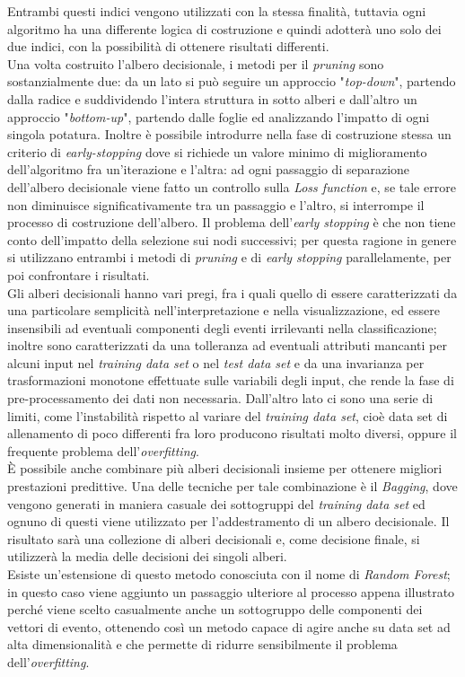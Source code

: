 Entrambi questi indici vengono utilizzati con la stessa finalità, tuttavia ogni algoritmo ha una differente logica di costruzione e quindi adotterà uno solo dei due indici, con la possibilità di ottenere risultati differenti. \\
Una volta costruito l'albero decisionale, i metodi per il \textit{pruning} sono sostanzialmente due: da un lato si può seguire un approccio "\textit{top-down}", partendo dalla radice e suddividendo l'intera struttura in sotto alberi e dall'altro un approccio "\textit{bottom-up}", partendo dalle foglie ed analizzando l'impatto di ogni singola potatura. Inoltre è possibile introdurre nella fase di costruzione stessa un criterio di \textit{early-stopping} dove si richiede un valore minimo di miglioramento dell'algoritmo fra un'iterazione e l'altra: ad ogni passaggio di separazione dell'albero decisionale viene fatto un controllo sulla \textit{Loss function} e, se tale errore non diminuisce significativamente tra un passaggio e l'altro, si interrompe il processo di costruzione dell'albero. Il problema dell'\textit{early stopping} è che non tiene conto dell'impatto della selezione sui nodi successivi; per questa ragione in genere si utilizzano entrambi i metodi di \textit{pruning} e di \textit{early stopping} parallelamente, per poi confrontare i risultati. \\
Gli alberi decisionali hanno vari pregi, fra i quali quello di essere caratterizzati da una particolare semplicità nell'interpretazione e nella visualizzazione, ed essere insensibili ad eventuali componenti degli eventi irrilevanti nella classificazione; inoltre sono caratterizzati da una tolleranza ad eventuali attributi mancanti per alcuni input nel \textit{training data set} o nel \textit{test data set} e da una invarianza per trasformazioni monotone effettuate sulle variabili degli input, che rende la fase di pre-processamento dei dati non necessaria. Dall'altro lato ci sono una serie di limiti, come l'instabilità rispetto al variare del \textit{training data set}, cioè data set di allenamento di poco differenti fra loro producono risultati molto diversi, oppure il frequente problema dell'\textit{overfitting}. \\
È possibile anche combinare più alberi decisionali insieme per ottenere migliori prestazioni predittive. Una delle tecniche per tale combinazione è il \textit{Bagging}, dove vengono generati in maniera casuale dei sottogruppi del \textit{training data set} ed ognuno di questi viene utilizzato per l'addestramento di un albero decisionale. Il risultato sarà una collezione di alberi decisionali e, come decisione finale, si utilizzerà la media delle decisioni dei singoli alberi. \\
Esiste un'estensione di questo metodo conosciuta con il nome di \textit{Random Forest}; in questo caso viene aggiunto un passaggio ulteriore al processo appena illustrato perché viene scelto casualmente anche un sottogruppo delle componenti dei vettori di evento, ottenendo così un metodo capace di agire anche su data set ad alta dimensionalità e che permette di ridurre sensibilmente il problema dell'\textit{overfitting}.

